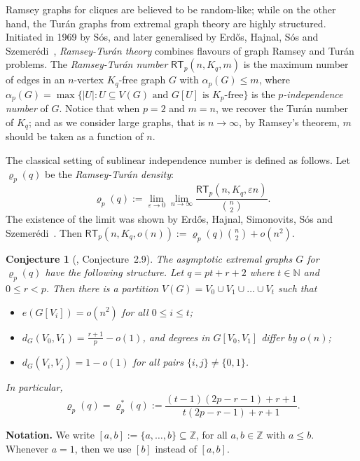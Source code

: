 \documentclass[10pt,a4paper]{article}
\newtheorem{conjx}{Conjecture}
\theoremstyle{definition}
\def\al{{\alpha}}
\def\eps{{\varepsilon}}
\newcommand{\rt}{{\mathsf{RT}}}
\begin{document}
Ramsey graphs for cliques are believed to be random-like; while on the other hand, the Tur\'an graphs from extremal graph theory are highly structured. Initiated in 1969 by S\'os, and later generalised by Erd\H{o}s, Hajnal, S\'os and Szemer\'edi~\cite{EHSSz}, \emph{Ramsey-Tur\'an theory} combines flavours of graph Ramsey and Tur\'an problems. The \emph{Ramsey-Tur\'an number} $\rt_p(n,K_q,m)$ is the maximum number of edges in an $n$-vertex $K_q$-free graph $G$ with $\alpha_p(G)\le m$, where $\al_p(G)=\max\{|U|:U\subseteq V(G)\text{ and }G[U]\text{ is }K_p\text{-free}\}$ is the \emph{$p$-independence number} of $G$. Notice that when $p=2$ and $m=n$, we recover the Tur\'an number of $K_q$; and as we consider large graphs, that is $n\rightarrow\infty$, by Ramsey's theorem, $m$ should be taken as a function of $n$.

The classical setting of sublinear independence number is defined as follows. Let $\varrho_p(q)$ be the \emph{Ramsey-Tur\'an density}: 
$$
\varrho_p(q) := \lim_{\eps\rightarrow 0}\lim_{n\rightarrow \infty}\frac{\rt_p(n,K_q,\eps n)}{\binom{n}{2}}.
$$
The existence of the limit was shown by Erd\H{o}s, Hajnal, Simonovits, S\'os and Szemer\'edi~\cite{EHSSSz}. Then $\rt_p(n,K_q,o(n)):=\varrho_p(q){n\choose 2}+o(n^2)$.

\begin{conjx}[\cite{EHSSSz}, Conjecture~2.9]\label{conj}
	The asymptotic extremal graphs $G$ for $\varrho_p(q)$ have the following structure.
	Let $q=pt+r+2$ where $t\in\mathbb{N}$ and $0 \leq r < p$. Then there is a partition $V(G)= V_0\cup V_1 \cup \ldots \cup V_t$ such that
	\begin{itemize}
		\item $e(G[V_i])=o(n^2)$ for all $0\le i \le t$;
		
		\item $d_G(V_0,V_1) = \frac{r+1}{p}-o(1)$, and degrees in $G[V_0,V_1]$ differ by $o(n)$;
		
		\item $d_G(V_i,V_j) =1-o(1)$ for all pairs $\lbrace i,j\rbrace \neq \lbrace 0,1\rbrace$.
	\end{itemize}
	In particular, 
	\begin{equation}\label{eq:conjRTdensity}
		\varrho_p(q)=\varrho_p^*(q):=\frac{(t-1)(2p-r-1)+r+1}{t(2p-r-1)+r+1}.
	\end{equation}
\end{conjx}

\textbf{Notation.} We write $[a,b]:=\{a,\ldots,b\}\subseteq \mathbb{Z}$, for all $a,b\in \mathbb{Z}$ with $a\le b$. Whenever $a=1$, then we use $[b]$ instead of $[a,b]$. 
\end{document}

